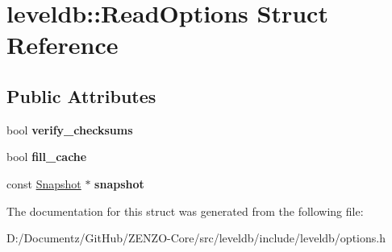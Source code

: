 \hypertarget{structleveldb_1_1_read_options}{}\section{leveldb\+::Read\+Options Struct Reference}
\label{structleveldb_1_1_read_options}
\subsection*{Public Attributes}
\begin{DoxyCompactItemize}
\item 
\mbox{\label{structleveldb_1_1_read_options_a43731d67b707995e20571ad33c1f53f2}} 
bool {\bfseries verify\+\_\+checksums}
\item 
\mbox{\label{structleveldb_1_1_read_options_a49f3754f8838596148ed5cbf9bbf8664}} 
bool {\bfseries fill\+\_\+cache}
\item 
\mbox{\label{structleveldb_1_1_read_options_a1fa3fffc267dff89fce7c39d7c7b5b50}} 
const \mbox{\hyperlink{classleveldb_1_1_snapshot}{Snapshot}} $\ast$ {\bfseries snapshot}
\end{DoxyCompactItemize}


The documentation for this struct was generated from the following file\+:\begin{DoxyCompactItemize}
\item 
D\+:/\+Documentz/\+Git\+Hub/\+Z\+E\+N\+Z\+O-\/\+Core/src/leveldb/include/leveldb/options.\+h\end{DoxyCompactItemize}
